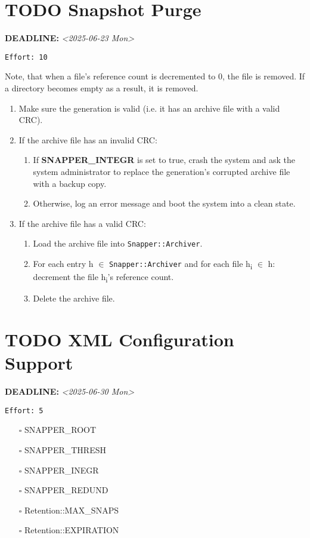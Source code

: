 \documentclass[11pt]{article}
\begin{document}
\section{{\bfseries\sffamily TODO}  Snapshot Purge}
\label{sec:orga64aeb8}
\noindent\textbf{DEADLINE:} \textit{<2025-06-23 Mon>}\\
\begin{verbatim}
Effort: 10
\end{verbatim}
Note, that when a file's reference count is decremented to 0, the file is removed. If a directory becomes empty as a result, it is removed.

\begin{enumerate}
\item Make sure the generation is valid (i.e. it has an archive file with a valid CRC).
\item If the archive file has an invalid CRC:
\begin{enumerate}
\item If \textbf{SNAPPER\_INTEGR} is set to true, crash the system and ask the system administrator to replace the generation's corrupted archive file with a backup copy.
\item Otherwise, log an error message and boot the system into a clean state.
\end{enumerate}
\item If the archive file has a valid CRC:
\begin{enumerate}
\item Load the archive file into \texttt{Snapper::Archiver}.
\item For each entry h \(\in\) \texttt{Snapper::Archiver} and for each file h\textsubscript{i} \(\in\) h: decrement the file h\textsubscript{i}'s reference count.
\item Delete the archive file.
\end{enumerate}
\end{enumerate}
\section{{\bfseries\sffamily TODO}  XML Configuration Support}
\label{sec:org0d4afce}
\noindent\textbf{DEADLINE:} \textit{<2025-06-30 Mon>}\\
\begin{verbatim}
Effort: 5
\end{verbatim}
\begin{itemize}
\item[{$\square$}] SNAPPER\_ROOT
\item[{$\square$}] SNAPPER\_THRESH
\item[{$\square$}] SNAPPER\_INEGR
\item[{$\square$}] SNAPPER\_REDUND
\item[{$\square$}] Retention::MAX\_SNAPS
\item[{$\square$}] Retention::EXPIRATION
\end{itemize}
\end{document}
